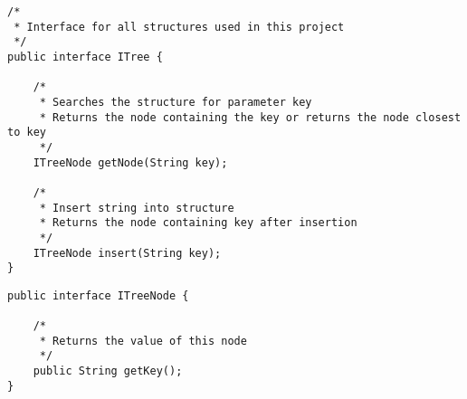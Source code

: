 \begin{lstlisting}[caption=Main classes Source code -ITree]
/*
 * Interface for all structures used in this project
 */
public interface ITree {
	
	/*
	 * Searches the structure for parameter key
	 * Returns the node containing the key or returns the node closest to key
	 */
	ITreeNode getNode(String key);
	
	/*
	 * Insert string into structure
	 * Returns the node containing key after insertion
	 */
	ITreeNode insert(String key);
}

\end{lstlisting}

\begin{lstlisting}[caption=Main classes Source code - ITreeNode]
public interface ITreeNode {

	/*
	 * Returns the value of this node
	 */
	public String getKey();
}
\end{lstlisting}